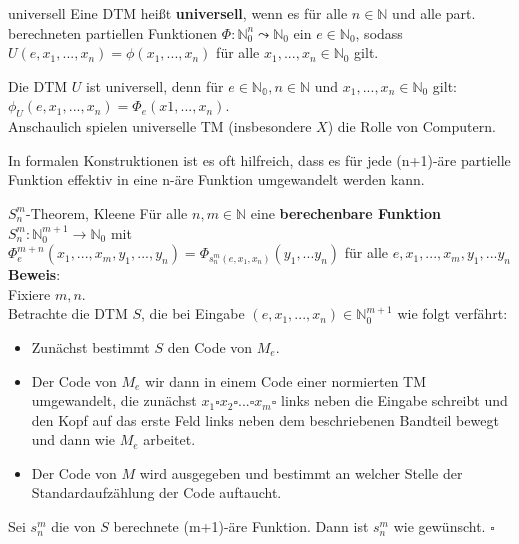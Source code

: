 \begin{defn}{universell}
    Eine DTM heißt \textbf{universell}, wenn es für alle $n \in \mathbb{N}$ und alle part. berechneten 
    partiellen Funktionen $\Phi : \mathbb{N}_0^n \leadsto \mathbb{N}_0$ ein $e \in \mathbb{N}_0$, sodass
    $U(e,x_1,...,x_n) = \phi(x_1,...,x_n)$ für alle $x_1,...,x_n \in \mathbb{N}_0$ gilt. 
\end{defn}

\begin{bem}
    Die DTM $U$ ist universell, denn für $e \in \mathbb{N_0}, n \in \mathbb{N}$ und $x_1,...,x_n \in \mathbb{N}_0$ gilt: \\
    $\phi_U(e,x_1,...,x_n) = \Phi_e(x1,...,x_n)$. \\

    Anschaulich spielen universelle TM (insbesondere $X$) die Rolle von Computern.
\end{bem}

In formalen Konstruktionen ist es oft hilfreich, dass es für jede (n+1)-äre partielle Funktion effektiv in eine n-äre
Funktion umgewandelt werden kann.

\begin{satz}{$S^m_n$-Theorem, Kleene}
    Für alle $n,m \in \mathbb{N}$ eine \textbf{berechenbare Funktion} $S^m_n : \mathbb{N}_0^{m+1} \rightarrow \mathbb{N}_0$ mit \\
    $\Phi^{m+n}_e(x_1,...,x_m,y_1,...,y_n) = \Phi_{s^m_n(e,x_1,x_n)}(y_1,...y_n)$ für alle $e,x_1,...,x_m,y_1,...y_n$ \\

    \textbf{Beweis}:\\
    Fixiere $m,n$. \\
    Betrachte die DTM $S$, die bei Eingabe $(e,x_1,...,x_n) \in \mathbb{N}^{m+1}_0$ wie folgt verfährt:
    \begin{itemize}
        \item Zunächst bestimmt $S$ den Code von $M_e$.
        \item Der Code von $M_e$ wir dann in einem Code einer normierten TM umgewandelt,
              die zunächst $x_1 \square x_2 \square ... \square x_m \square$ links neben
              die Eingabe schreibt und den Kopf auf das erste Feld links neben dem beschriebenen
              Bandteil bewegt und dann wie $M_e$ arbeitet.
        \item Der Code von $M$ wird ausgegeben und bestimmt an welcher Stelle der Standardaufzählung
              der Code auftaucht.
    \end{itemize}
    Sei $s^m_n$ die von $S$ berechnete (m+1)-äre Funktion. Dann ist $s^m_n$ wie gewünscht. $\square$
\end{satz}
